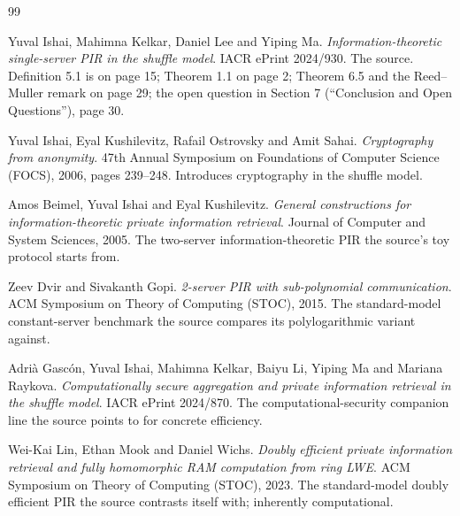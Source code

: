 \documentclass{conjura-conjecture}
\begin{document}
\begin{conjurabibliography}{99}

Yuval Ishai, Mahimna Kelkar, Daniel Lee and Yiping Ma.
\emph{Information-theoretic single-server PIR in the shuffle model}.
IACR ePrint 2024/930.
The source. Definition 5.1 is on page 15; Theorem 1.1 on page 2;
Theorem 6.5 and the Reed--Muller remark on page 29; the open question in
Section 7 (``Conclusion and Open Questions''), page 30.

Yuval Ishai, Eyal Kushilevitz, Rafail Ostrovsky and Amit Sahai.
\emph{Cryptography from anonymity}.
47th Annual Symposium on Foundations of Computer Science (FOCS), 2006,
pages 239--248.
Introduces cryptography in the shuffle model.

Amos Beimel, Yuval Ishai and Eyal Kushilevitz.
\emph{General constructions for information-theoretic private
information retrieval}.
Journal of Computer and System Sciences, 2005.
The two-server information-theoretic PIR the source's toy protocol
starts from.

Zeev Dvir and Sivakanth Gopi.
\emph{2-server PIR with sub-polynomial communication}.
ACM Symposium on Theory of Computing (STOC), 2015.
The standard-model constant-server benchmark the source compares its
polylogarithmic variant against.

Adri\`a Gasc\'on, Yuval Ishai, Mahimna Kelkar, Baiyu Li, Yiping Ma and
Mariana Raykova.
\emph{Computationally secure aggregation and private information
retrieval in the shuffle model}.
IACR ePrint 2024/870.
The computational-security companion line the source points to for
concrete efficiency.

Wei-Kai Lin, Ethan Mook and Daniel Wichs.
\emph{Doubly efficient private information retrieval and fully
homomorphic RAM computation from ring LWE}.
ACM Symposium on Theory of Computing (STOC), 2023.
The standard-model doubly efficient PIR the source contrasts itself
with; inherently computational.

\end{conjurabibliography}
\end{document}

